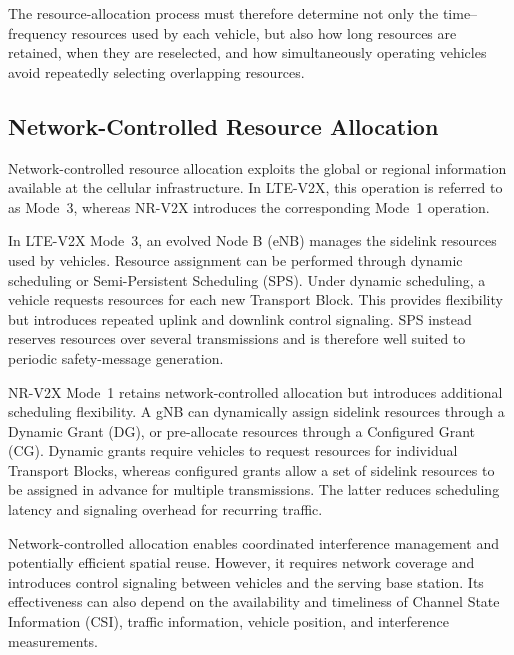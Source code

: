 The resource-allocation process must therefore determine not only the
time--frequency resources used by each vehicle, but also how long resources
are retained, when they are reselected, and how simultaneously operating
vehicles avoid repeatedly selecting overlapping resources.

\subsection{Network-Controlled Resource Allocation}

Network-controlled resource allocation exploits the global or regional
information available at the cellular infrastructure. In LTE-V2X, this
operation is referred to as Mode~3, whereas NR-V2X introduces the
corresponding Mode~1 operation.

In LTE-V2X Mode~3, an evolved Node B (eNB) manages the sidelink resources
used by vehicles. Resource assignment can be performed through dynamic
scheduling or Semi-Persistent Scheduling (SPS). Under dynamic scheduling,
a vehicle requests resources for each new Transport Block. This provides
flexibility but introduces repeated uplink and downlink control signaling.
SPS instead reserves resources over several transmissions and is therefore
well suited to periodic safety-message generation.

NR-V2X Mode~1 retains network-controlled allocation but introduces
additional scheduling flexibility. A gNB can dynamically assign sidelink
resources through a Dynamic Grant (DG), or pre-allocate resources through a
Configured Grant (CG). Dynamic grants require vehicles to request resources
for individual Transport Blocks, whereas configured grants allow a set of
sidelink resources to be assigned in advance for multiple transmissions.
The latter reduces scheduling latency and signaling overhead for recurring
traffic.

Network-controlled allocation enables coordinated interference management
and potentially efficient spatial reuse. However, it requires network
coverage and introduces control signaling between vehicles and the serving
base station. Its effectiveness can also depend on the availability and
timeliness of Channel State Information (CSI), traffic information, vehicle
position, and interference measurements.

